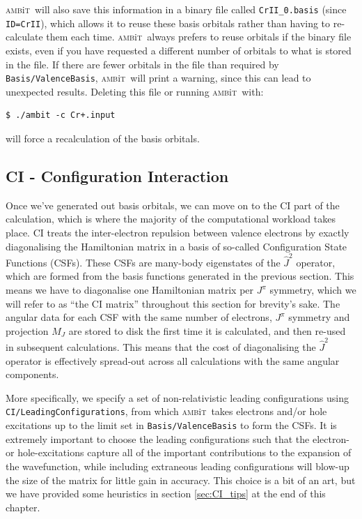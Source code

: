 \documentclass{report}
\newcommand{\ambit}{\textsc{amb}{\footnotesize i}\textsc{t}}
\begin{document}
\ambit\  will also save this information in a binary file called \texttt{CrII\_0.basis} (since
\texttt{ID=CrII}), which allows it to reuse these basis orbitals rather than having to re-calculate them
each time. \ambit\  always prefers to reuse orbitals if the binary file exists, even if you have
requested a different number of orbitals to what is stored in the file. If there are fewer orbitals in
the file than required by \texttt{Basis/ValenceBasis}, \ambit\  will print a warning, since this can lead
to unexpected results. Deleting this file or running \ambit\  with:

\begin{verbatim}
$ ./ambit -c Cr+.input
\end{verbatim}

will force a recalculation of the basis orbitals.

\subsection{CI - Configuration Interaction}

Once we've generated out basis orbitals, we can move on to the CI part of the calculation, which is
where the majority of the computational workload takes place. CI treats the inter-electron repulsion
between valence electrons by exactly diagonalising the Hamiltonian matrix in a basis of so-called
Configuration State Functions (CSFs). These CSFs are many-body eigenstates of the $\hat{J}^2$
operator, which are formed from the basis functions generated in the previous section. This means we
have to diagonalise one Hamiltonian matrix per $J^{\pi}$ symmetry, which we will refer to as ``the CI 
matrix'' throughout this section for brevity's sake.  The angular data for each CSF with the same number
of electrons, $J^{\pi}$ symmetry and projection $M_J$ are stored to disk the first time it is
calculated, and then re-used in subsequent calculations. This means that the cost of diagonalising the
$\hat{J}^2$ operator is effectively spread-out across all calculations with the same angular components.

More specifically, we specify a set of non-relativistic leading configurations using 
\texttt{CI/LeadingConfigurations}, from which \ambit\  takes electrons and/or hole excitations up to the
limit set in \texttt{Basis/ValenceBasis} to form the CSFs. It is extremely important to choose the
leading configurations such that the electron- or hole-excitations capture all of the important
contributions to the expansion of the wavefunction, while including extraneous leading configurations
will blow-up the size of the matrix for little gain in accuracy. This choice is a bit of an art, but we
have provided some heuristics in section \ref{sec:CI_tips} at the end of this chapter.
\end{document}
